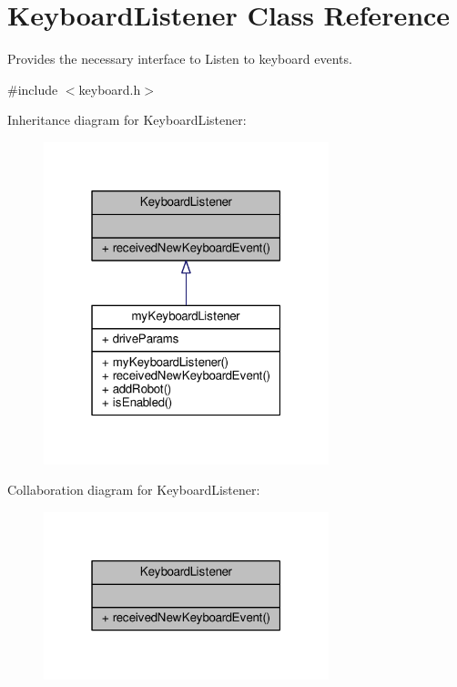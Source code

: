 \hypertarget{class_keyboard_listener}{}\section{Keyboard\+Listener Class Reference}
\label{class_keyboard_listener}


Provides the necessary interface to Listen to keyboard events.  




{\ttfamily \#include $<$keyboard.\+h$>$}



Inheritance diagram for Keyboard\+Listener\+:
\nopagebreak
\begin{figure}[H]
\begin{center}
\leavevmode
\includegraphics[width=235pt]{class_keyboard_listener__inherit__graph}
\end{center}
\end{figure}


Collaboration diagram for Keyboard\+Listener\+:
\nopagebreak
\begin{figure}[H]
\begin{center}
\leavevmode
\includegraphics[width=235pt]{class_keyboard_listener__coll__graph}
\end{center}
\end{figure}
